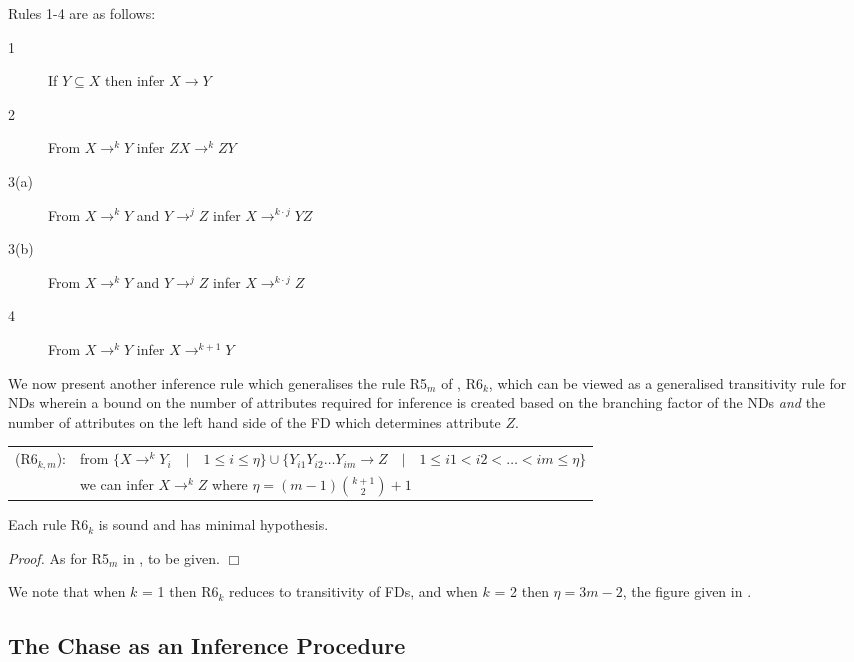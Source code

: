 \medskip
Rules 1-4 are as follows:
\begin{description}
\item[1] If $Y \subseteq X$ then infer $X \to Y$
\item[2] From $X \to^k Y$ infer $ZX \to^k ZY$
\item[3(a)] From $X \to^k Y$ and $Y \to^j Z$ infer $X \to^{k \cdot j} YZ$
\item[3(b)] From $X \to^k Y$ and $Y \to^j Z$ infer $X \to^{k \cdot j} Z$
\item[4] From $X \to^k Y$ infer $X \to^{k + 1} Y$
\end{description}

We now present another inference rule which generalises the rule
R5$_m$ of \cite{gm85b}, R6$_k$, which can be viewed as a generalised
transitivity rule for NDs wherein a bound on the number of attributes
required for inference is created based on the branching factor of the
NDs {\em and} the number of attributes on the left hand side of the FD
which determines attribute $Z$.

\smallskip
{\line
\begin{table}[ht]
\begin{tabular}{cl} \\
(R6$_{k,m}$): 	& from $\{ X \to^{k} Y_i \quad |  \quad 1 \le i \le \eta \} \cup 
		\{ Y_{i1}Y_{i2} \ldots Y_{im} \to Z   \quad |  \quad 1
		\le i1 < i2 < \ldots < im \le \eta \}$ \\ 
\rule{0cm}{5mm} & we can infer $X \to^{k} Z$ where $\eta =
		(m-1){k+1 \choose 2} + 1$\\
\end{tabular}
\end{table}}
\smallskip

\begin{theorem}\label{th:1}
\begin{rm}
Each rule R6$_{k}$ is sound and has minimal hypothesis.
\end{rm}
\end{theorem}

{\em Proof.} As for R5$_m$ in \cite{gm85b}, to be given. $\Box$

\medskip

We note that when $k$ = 1 then R6$_k$ reduces to transitivity of FDs,
and when $k$ = 2 then $\eta = 3m - 2$, the figure given in
\cite{gm85b}. 


\subsection{The Chase as an Inference Procedure}\label{subsec:nd_ch_inf}

